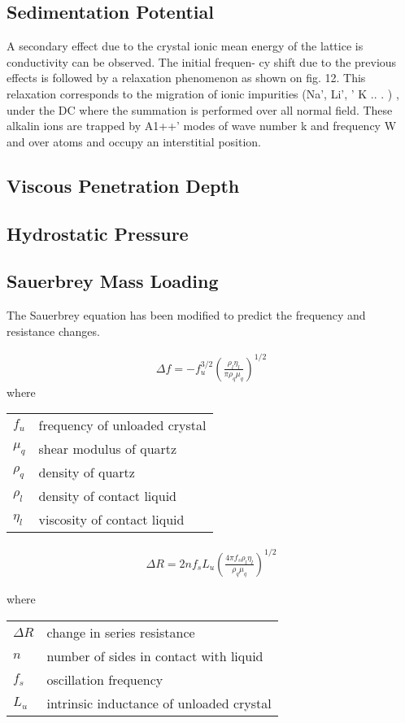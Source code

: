 \documentclass[a4paper]{article}
\begin{document}
\subsection{Sedimentation Potential}
A secondary effect due to the crystal ionic
mean energy of the lattice is
conductivity can be observed. The initial frequen-
cy shift due to the previous effects
 is followed
by a relaxation phenomenon as shown on fig. 12.
This relaxation corresponds to the migration
 of
ionic impurities (Na', Li',
 ' K
 .. .
 ) , under the DC
 where the summation is performed over all normal
field. These alkalin ions are trapped by A1++'
 modes of wave number k and frequency
 W and
 over
atoms and occupy an interstitial position.



\subsection{Viscous Penetration Depth}
\subsection{Hydrostatic Pressure}

\subsection{Sauerbrey Mass Loading}
The Sauerbrey equation has been modified to predict the frequency and
resistance changes.

\begin{align}
 \Delta f = -f_u^{3/2} \left(\frac{\rho_l \eta_l}{\pi \rho_q \mu_q}\right)^{1/2}
\end{align}
where

\begin{tabular}{ll}
$f_u$     & frequency of unloaded crystal \\
$\mu_q$   & shear modulus of quartz \\
$\rho_q$  & density of quartz \\
$\rho_l$  & density of contact liquid \\
$\eta_l$   & viscosity of contact liquid
\end{tabular}

\begin{align}
 \Delta R = 2 n f_s L_u \left(\frac{4 \pi f_s \rho_l \eta_l}{\rho_q \mu_q}\right)^{1/2}
\end{align}

where
\begin{tabular}{ll}
$\Delta R$ & change in series resistance \\
$n$        & number of sides in contact with liquid \\
$f_s$      & oscillation frequency \\
$L_u$      & intrinsic inductance of unloaded crystal \\
\end{tabular}
\end{document}
